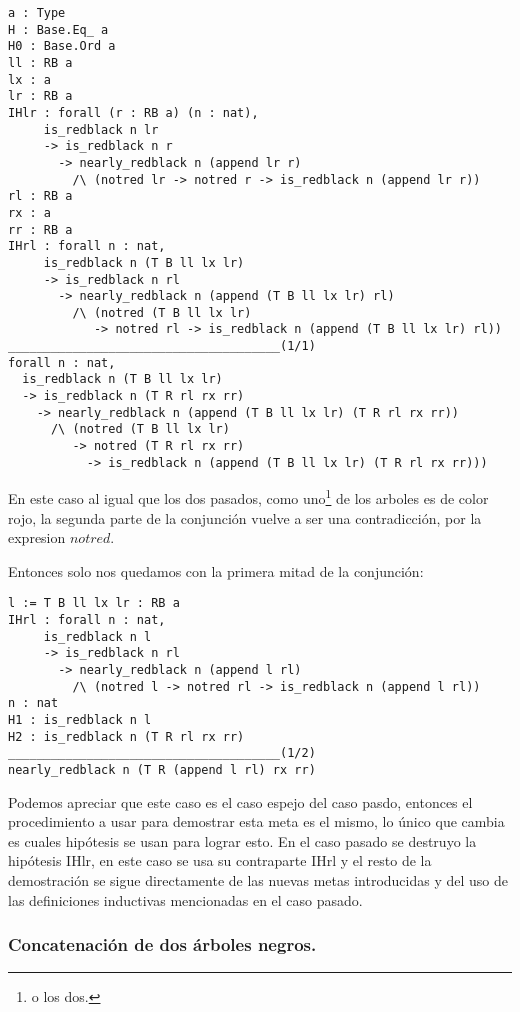 \begin{verbatim}
a : Type
H : Base.Eq_ a
H0 : Base.Ord a
ll : RB a
lx : a
lr : RB a
IHlr : forall (r : RB a) (n : nat),
     is_redblack n lr
     -> is_redblack n r
       -> nearly_redblack n (append lr r)
         /\ (notred lr -> notred r -> is_redblack n (append lr r))
rl : RB a
rx : a
rr : RB a
IHrl : forall n : nat,
     is_redblack n (T B ll lx lr)
     -> is_redblack n rl
       -> nearly_redblack n (append (T B ll lx lr) rl)
         /\ (notred (T B ll lx lr)
            -> notred rl -> is_redblack n (append (T B ll lx lr) rl))
______________________________________(1/1)
forall n : nat,
  is_redblack n (T B ll lx lr)
  -> is_redblack n (T R rl rx rr)
    -> nearly_redblack n (append (T B ll lx lr) (T R rl rx rr))
      /\ (notred (T B ll lx lr)
         -> notred (T R rl rx rr)
           -> is_redblack n (append (T B ll lx lr) (T R rl rx rr)))
\end{verbatim}

En este caso al igual que los dos pasados, como uno\footnote{o los dos.} de los arboles es de
color rojo, la segunda parte de la conjunci\'on vuelve a ser una contradicci\'on, por la expresion
$notred$.

Entonces solo nos quedamos con la primera mitad de la conjunci\'on:

\begin{verbatim}
l := T B ll lx lr : RB a
IHrl : forall n : nat,
     is_redblack n l
     -> is_redblack n rl
       -> nearly_redblack n (append l rl)
         /\ (notred l -> notred rl -> is_redblack n (append l rl))
n : nat
H1 : is_redblack n l
H2 : is_redblack n (T R rl rx rr)
______________________________________(1/2)
nearly_redblack n (T R (append l rl) rx rr)
\end{verbatim}

Podemos apreciar que este caso es el caso espejo del caso pasdo, entonces el procedimiento a usar
para demostrar esta meta es el mismo, lo \'unico que cambia es cuales hip\'otesis se usan para
lograr esto. En el caso pasado se destruyo la hip\'otesis IHlr, en este caso se usa su contraparte
IHrl y el resto de la demostraci\'on se sigue directamente de las nuevas metas introducidas y del
uso de las definiciones inductivas mencionadas en el caso pasado.

\subsubsection{Concatenaci\'on de dos \'arboles negros.}


